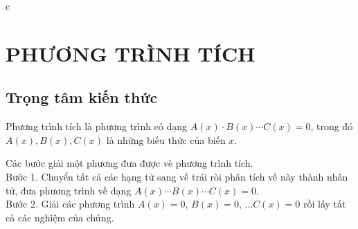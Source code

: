c{%

\section{PHƯƠNG TRÌNH TÍCH}
\subsection{Trọng tâm kiến thức}
\begin{dn}
	Phương trình tích là phương trình có dạng $A(x)\cdot B(x)\cdots C(x) = 0$, trong đó $A(x), B(x), C(x)$ là những biếu thức của biến $x$.
	\end{dn}
\begin{note}
 Các bước giải một phương đưa được vè phương trình tích.\\
	Bước 1. Chuyển tất cả các hạng tử sang vế trái ròi phân tích vế này thành nhân tử, đưa phương trình về dạng $A(x) \cdots B(x) \cdots C(x) = 0.$\\
	Bước 2. Giải các phương trình $A(x) = 0$, $B(x) = 0$, $\ldots C(x) = 0$ rồi lấy tất cả các nghiệm của chúng.
\end{note}

}
